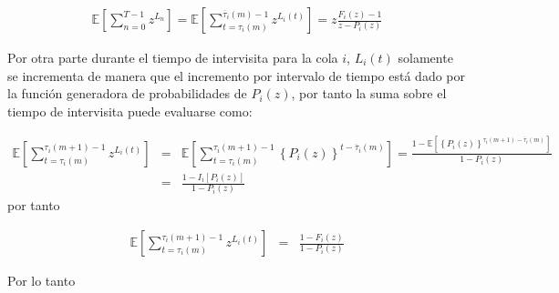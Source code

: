 \documentclass{article}
\newcommand{\esp}{\mathbb{E}}
\begin{document}
\begin{eqnarray}\label{Eq.Arribos.Primera}
\esp\left[\sum_{n=0}^{T-1}z^{L_{n}}\right]=
\esp\left[\sum_{t=\tau_{i}\left(m\right)}^{\overline{\tau}_{i}\left(m\right)-1}z^{L_{i}\left(t\right)}\right]
=z\frac{F_{i}\left(z\right)-1}{z-P_{i}\left(z\right)}
\end{eqnarray}

Por otra parte durante el tiempo de intervisita para la cola $i$, $L_{i}\left(t\right)$ solamente se incrementa de manera que el incremento por intervalo de tiempo est\'a dado por la funci\'on generadora de probabilidades de $P_{i}\left(z\right)$, por tanto la suma sobre el tiempo de intervisita puede evaluarse como:

\begin{eqnarray*}
\esp\left[\sum_{t=\tau_{i}\left(m\right)}^{\tau_{i}\left(m+1\right)-1}z^{L_{i}\left(t\right)}\right]&=&\esp\left[\sum_{t=\tau_{i}\left(m\right)}^{\tau_{i}\left(m+1\right)-1}\left\{P_{i}\left(z\right)\right\}^{t-\overline{\tau}_{i}\left(m\right)}\right]=\frac{1-\esp\left[\left\{P_{i}\left(z\right)\right\}^{\tau_{i}\left(m+1\right)-\overline{\tau}_{i}\left(m\right)}\right]}{1-P_{i}\left(z\right)}\\
&=&\frac{1-I_{i}\left[P_{i}\left(z\right)\right]}{1-P_{i}\left(z\right)}
\end{eqnarray*}
por tanto

\begin{eqnarray*}
\esp\left[\sum_{t=\tau_{i}\left(m\right)}^{\tau_{i}\left(m+1\right)-1}z^{L_{i}\left(t\right)}\right]&=&
\frac{1-F_{i}\left(z\right)}{1-P_{i}\left(z\right)}
\end{eqnarray*}

Por lo tanto
\end{document}
